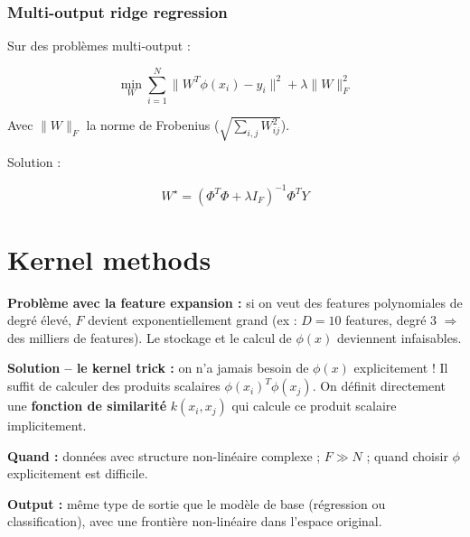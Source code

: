 \documentclass[11pt,a4paper,openany]{book}
\begin{document}
\vspace{0.9cm}

\subsubsection{Multi-output ridge regression}

\vspace{0.3cm}

Sur des problèmes multi-output :

\[
\min_W
\sum_{i=1}^{N}
\|W^T \phi(x_i) - y_i\|^2
+
\lambda
\|W\|_F^2
\]

Avec $\|W\|_F$ la norme de Frobenius ($\sqrt{\sum_{i,j} W_{ij}^2}$).

\vspace{0.6cm}

Solution :

\[
W^\star
=
\left(
\Phi^T \Phi
+
\lambda I_F
\right)^{-1}
\Phi^T Y
\]

\vspace{8cm}

\newpage \section{Kernel methods}

\begin{rembox}[title=Pourquoi et quand utiliser les kernels ?]
\textbf{Problème avec la feature expansion :} si on veut des features polynomiales de degré élevé, $F$ devient exponentiellement grand (ex : $D = 10$ features, degré 3 $\Rightarrow$ des milliers de features). Le stockage et le calcul de $\phi(x)$ deviennent infaisables.

\vspace{0.3cm}

\textbf{Solution -- le kernel trick :} on n'a jamais besoin de $\phi(x)$ explicitement ! Il suffit de calculer des produits scalaires $\phi(x_i)^T \phi(x_j)$. On définit directement une \textbf{fonction de similarité} $k(x_i, x_j)$ qui calcule ce produit scalaire implicitement.

\vspace{0.3cm}

\textbf{Quand :} données avec structure non-linéaire complexe ; $F \gg N$ ; quand choisir $\phi$ explicitement est difficile.

\vspace{0.3cm}

\textbf{Output :} même type de sortie que le modèle de base (régression ou classification), avec une frontière non-linéaire dans l'espace original.
\end{rembox}
\end{document}
